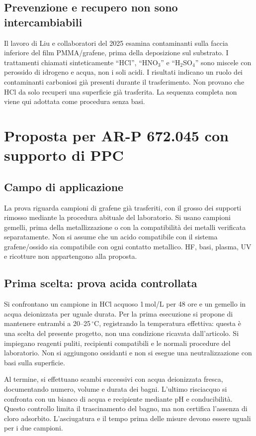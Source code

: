 \documentclass[11pt,reqno]{amsart}
\numberwithin{equation}{section}
\newcommand{\degC}{\ensuremath{^{\circ}\mathrm{C}}}
\begin{document}
\subsection{Prevenzione e recupero non sono intercambiabili}
Il lavoro di Liu e collaboratori del 2025 \cite{Liu2025} esamina
contaminanti sulla faccia inferiore del film PMMA/grafene, prima della
deposizione sul substrato. I trattamenti chiamati sinteticamente
``HCl'', ``HNO$_3$'' e ``H$_2$SO$_4$'' sono miscele con perossido
di idrogeno e acqua, non i soli acidi. I risultati indicano un ruolo
dei contaminanti carboniosi gi\`a presenti durante il trasferimento.
Non provano che HCl da solo recuperi una superficie gi\`a trasferita.
La sequenza completa non viene qui adottata come procedura senza basi.

\section{Proposta per AR-P 672.045 con supporto di PPC}

\subsection{Campo di applicazione}
La prova riguarda campioni di grafene gi\`a trasferiti, con il grosso
dei supporti rimosso mediante la procedura abituale del laboratorio.
Si usano campioni gemelli, prima della metallizzazione o con la
compatibilit\`a dei metalli verificata separatamente. Non si assume
che un acido compatibile con il sistema grafene/ossido sia compatibile
con ogni contatto metallico. HF, basi, plasma, UV e ricotture non
appartengono alla proposta.

\subsection{Prima scelta: prova acida controllata}
Si confrontano un campione in HCl acquoso 1\,mol/L per 48 ore
e un gemello in acqua deionizzata per uguale durata. Per la prima
esecuzione si propone di mantenere entrambi a 20--25\,\degC,
registrando la temperatura effettiva: questa \`e una scelta del presente
progetto, non una condizione ricavata dall'articolo.
Si impiegano reagenti puliti, recipienti compatibili e le normali
procedure del laboratorio. Non si aggiungono ossidanti e non si
esegue una neutralizzazione con basi sulla superficie.

Al termine, si effettuano scambi successivi con acqua deionizzata
fresca, documentando numero, volume e durata dei bagni. L'ultimo
risciacquo si confronta con un bianco di acqua e recipiente mediante
pH e conducibilit\`a. Questo controllo limita il trascinamento del
bagno, ma non certifica l'assenza di cloro adsorbito. L'asciugatura
e il tempo prima delle misure devono essere uguali per i due campioni.
\end{document}
